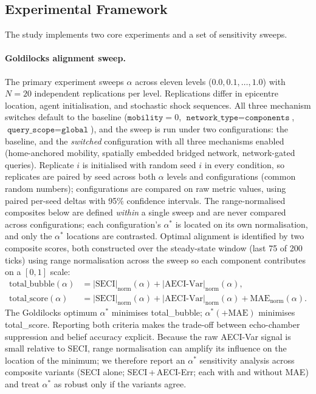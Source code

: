 \subsection{Experimental Framework}

The study implements two core experiments and a set of sensitivity sweeps.

\paragraph{Goldilocks alignment sweep.}
The primary experiment sweeps $\alpha$ across eleven levels ($0.0,0.1,\ldots,1.0$)
with $N=20$ independent replications per level.
Replications differ in epicentre location, agent initialisation, and stochastic
shock sequences.
All three mechanism switches default to the baseline
($\texttt{mobility}=0$, $\texttt{network\_type}=\texttt{components}$,
$\texttt{query\_scope}=\texttt{global}$), and the sweep is run under two
configurations: the baseline, and the \emph{switched} configuration with all
three mechanisms enabled (home-anchored mobility, spatially embedded bridged
network, network-gated queries).
Replicate $i$ is initialised with random seed $i$ in every condition, so
replicates are paired by seed across both $\alpha$ levels and configurations
(common random numbers); configurations are compared on raw metric values, using
paired per-seed deltas with 95\% confidence intervals.
The range-normalised composites below are defined \emph{within} a single sweep
and are never compared across configurations; each configuration's $\alpha^*$ is
located on its own normalisation, and only the $\alpha^*$ locations are
contrasted.
Optimal alignment is identified by two composite scores, both constructed over the
steady-state window (last 75 of 200 ticks) using range normalisation across the
sweep so each component contributes on a $[0,1]$ scale:
%
\begin{align}
  \text{total\_bubble}(\alpha)
    &= |\mathrm{SECI}|_{\mathrm{norm}}(\alpha)
       + |\mathrm{AECI\text{-}Var}|_{\mathrm{norm}}(\alpha), \label{eq:bubble}\\
  \text{total\_score}(\alpha)
    &= |\mathrm{SECI}|_{\mathrm{norm}}(\alpha)
       + |\mathrm{AECI\text{-}Var}|_{\mathrm{norm}}(\alpha)
       + \mathrm{MAE}_{\mathrm{norm}}(\alpha). \label{eq:score}
\end{align}
%
The Goldilocks optimum $\alpha^*$ minimises total\_bubble; $\alpha^*(+\mathrm{MAE})$
minimises total\_score.
Reporting both criteria makes the trade-off between echo-chamber suppression and
belief accuracy explicit.
Because the raw AECI-Var signal is small relative to SECI, range normalisation
can amplify its influence on the location of the minimum; we therefore report an
$\alpha^*$ sensitivity analysis across composite variants (SECI alone;
SECI\,+\,AECI-Err; each with and without MAE) and treat $\alpha^*$ as robust only
if the variants agree.

